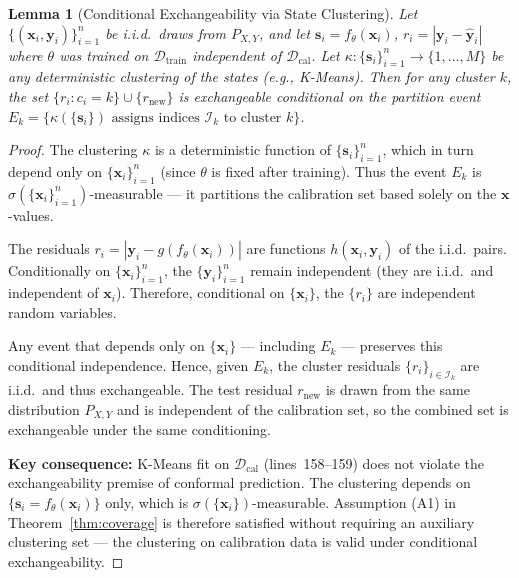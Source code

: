 \documentclass[11pt]{article}
\newtheorem{lemma}[theorem]{Lemma}
\newcommand{\cD}{\mathcal{D}}
\begin{document}
\begin{lemma}[Conditional Exchangeability via State Clustering]\label{lem:cluster-exchangeable}
Let $\{(\mathbf{x}_i, \mathbf{y}_i)\}_{i=1}^{n}$ be i.i.d.\ draws from $P_{X,Y}$, and let $\mathbf{s}_i = f_\theta(\mathbf{x}_i)$, $r_i = |\mathbf{y}_i - \hat{\mathbf{y}}_i|$ where $\theta$ was trained on $\cD_{\text{train}}$ independent of $\cD_{\text{cal}}$. Let $\kappa: \{\mathbf{s}_i\}_{i=1}^{n} \to \{1,\dots,M\}$ be any deterministic clustering of the states (e.g., K-Means). Then for any cluster $k$, the set $\{r_i \colon c_i = k\} \cup \{r_{\text{new}}\}$ is exchangeable conditional on the partition event $E_k = \{\kappa(\{\mathbf{s}_i\}) \text{ assigns indices } \mathcal{I}_k \text{ to cluster } k\}$.
\end{lemma}
\begin{proof}
The clustering $\kappa$ is a deterministic function of $\{\mathbf{s}_i\}_{i=1}^{n}$, which in turn depend only on $\{\mathbf{x}_i\}_{i=1}^{n}$ (since $\theta$ is fixed after training). Thus the event $E_k$ is $\sigma(\{\mathbf{x}_i\}_{i=1}^{n})$-measurable — it partitions the calibration set based solely on the $\mathbf{x}$-values.

The residuals $r_i = |\mathbf{y}_i - g(f_\theta(\mathbf{x}_i))|$ are functions $h(\mathbf{x}_i, \mathbf{y}_i)$ of the i.i.d.\ pairs. Conditionally on $\{\mathbf{x}_i\}_{i=1}^{n}$, the $\{\mathbf{y}_i\}_{i=1}^{n}$ remain independent (they are i.i.d.\ and independent of $\mathbf{x}_i$). Therefore, conditional on $\{\mathbf{x}_i\}$, the $\{r_i\}$ are independent random variables.

Any event that depends only on $\{\mathbf{x}_i\}$ — including $E_k$ — preserves this conditional independence. Hence, given $E_k$, the cluster residuals $\{r_i\}_{i \in \mathcal{I}_k}$ are i.i.d.\ and thus exchangeable. The test residual $r_{\text{new}}$ is drawn from the same distribution $P_{X,Y}$ and is independent of the calibration set, so the combined set is exchangeable under the same conditioning.

\textbf{Key consequence:} K-Means fit on $\cD_{\text{cal}}$ (lines~158--159) does not violate the exchangeability premise of conformal prediction. The clustering depends on $\{\mathbf{s}_i = f_\theta(\mathbf{x}_i)\}$ only, which is $\sigma(\{\mathbf{x}_i\})$-measurable. Assumption (A1) in Theorem~\ref{thm:coverage} is therefore satisfied without requiring an auxiliary clustering set — the clustering on calibration data is valid under conditional exchangeability.
\end{proof}
\end{document}
